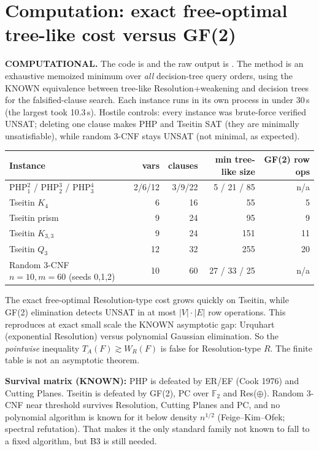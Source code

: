 \documentclass[11pt]{article}
\begin{document}
\section{Computation: exact free-optimal tree-like cost versus GF(2)}\label{s:comp}
\textbf{COMPUTATIONAL.} The code is  and
the raw output is .
The method is an exhaustive memoized minimum over \emph{all} decision-tree query orders,
using the KNOWN equivalence between tree-like Resolution+weakening and decision trees
for the falsified-clause search. Each instance runs in its own process in under 30\,s
(the largest took 10.3\,s). Hostile controls: every instance was brute-force verified UNSAT;
deleting one clause makes PHP and Tseitin SAT (they are minimally unsatisfiable), while random
3-CNF stays UNSAT (not minimal, as expected).
\begin{center}\begin{tabular}{lrrrr}\toprule
Instance & vars & clauses & min tree-like size & GF(2) row ops\\\midrule
PHP$^2_1$ / PHP$^3_2$ / PHP$^4_3$ & 2/6/12 & 3/9/22 & 5 / 21 / 85 & n/a\\
Tseitin $K_4$ & 6 & 16 & 55 & 5\\
Tseitin prism & 9 & 24 & 95 & 9\\
Tseitin $K_{3,3}$ & 9 & 24 & 151 & 11\\
Tseitin $Q_3$ & 12 & 32 & 255 & 20\\
Random 3-CNF $n{=}10,m{=}60$ (seeds 0,1,2) & 10 & 60 & 27 / 33 / 25 & n/a\\\bottomrule
\end{tabular}\end{center}
The exact free-optimal Resolution-type cost grows quickly on Tseitin, while GF(2)
elimination detects UNSAT in at most $|V|\cdot|E|$ row operations. This reproduces at
exact small scale the KNOWN asymptotic gap: Urquhart (exponential Resolution) versus
polynomial Gaussian elimination. So the \emph{pointwise} inequality $T_A(F)\gtrsim W_R(F)$
is false for Resolution-type $R$. The finite table is not an asymptotic theorem.

\textbf{Survival matrix (KNOWN):} PHP is defeated by ER/EF (Cook 1976) and Cutting Planes.
Tseitin is defeated by GF(2), PC over $\mathbb F_2$ and Res($\oplus$). Random 3-CNF near
threshold survives Resolution, Cutting Planes and PC, and no polynomial algorithm is known
for it below density $n^{1/2}$ (Feige--Kim--Ofek; spectral refutation). That makes it the
only standard family not known to fall to a fixed algorithm, but B3 is still needed.
\end{document}

